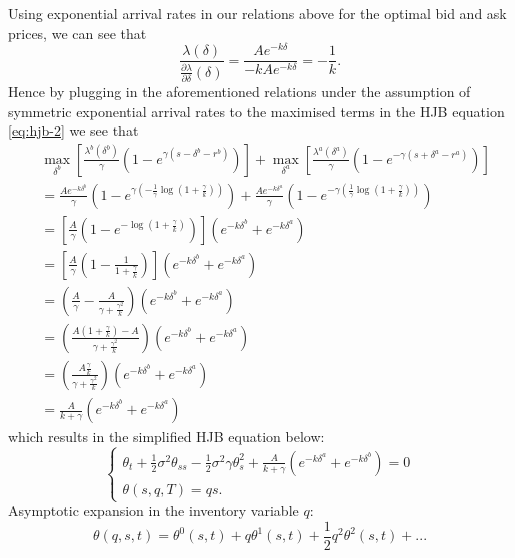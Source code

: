 Using exponential arrival rates in our relations above for the optimal bid and 
ask prices, we can see that
\begin{equation*}
    \frac{\lambda(\delta)}{\frac{\partial\lambda}{\partial\delta}(\delta)}=\frac{Ae^{-k\delta}}{-kAe^{-k\delta}}=-\frac{1}{k}.
\end{equation*}
Hence by plugging in the aforementioned relations under the assumption of symmetric
exponential arrival rates to the maximised terms in the HJB equation \ref{eq:hjb-2}
we see that
\begin{align*}
    &\max\limits_{\delta^b}\left[\frac{\lambda^b(\delta^b)}{\gamma}(1-e^{\gamma(s-\delta^b-r^b)})\right]+\max\limits_{\delta^a}\left[\frac{\lambda^a(\delta^a)}{\gamma}(1-e^{-\gamma(s+\delta^a-r^a)})\right]\\
    &=\frac{Ae^{-k\delta^b}}{\gamma}\left(1-e^{\gamma\left(-\frac{1}{\gamma}\log\left(1+\frac{\gamma}{k}\right)\right)}\right)+\frac{Ae^{-k\delta^a}}{\gamma}\left(1-e^{-\gamma\left(\frac{1}{\gamma}\log\left(1+\frac{\gamma}{k}\right)\right)}\right)\\
    &=\left[\frac{A}{\gamma}\left(1-e^{-\log\left(1+\frac{\gamma}{k}\right)}\right)\right](e^{-k\delta^b}+e^{-k\delta^a})\\
    &=\left[\frac{A}{\gamma}\left(1-\frac{1}{1+\frac{\gamma}{k}}\right)\right](e^{-k\delta^b}+e^{-k\delta^a})\\
    &=\left(\frac{A}{\gamma}-\frac{A}{\gamma+\frac{\gamma^2}{k}}\right)(e^{-k\delta^b}+e^{-k\delta^a})\\
    &=\left(\frac{A\left(1+\frac{\gamma}{k}\right)-A}{\gamma+\frac{\gamma^2}{k}}\right)(e^{-k\delta^b}+e^{-k\delta^a})\\
    &=\left(\frac{A\frac{\gamma}{k}}{\gamma+\frac{\gamma^2}{k}}\right)(e^{-k\delta^b}+e^{-k\delta^a})\\
    &=\frac{A}{k+\gamma}(e^{-k\delta^b}+e^{-k\delta^a})
\end{align*}
which results in the simplified HJB equation below:
\begin{equation}\label{eq:simp-hjb}
    \begin{cases} 
        \theta_t+\frac{1}{2}\sigma^2\theta_{ss}-\frac{1}{2}\sigma^2\gamma\theta^2_s+\frac{A}{k+\gamma}(e^{-k\delta^a}+e^{-k\delta^b})=0\\
        \theta(s,q,T)=qs.
    \end{cases}
\end{equation}
Asymptotic expansion in the inventory variable $q$:
\begin{equation}\label{eq:asymp}
    \theta(q,s,t)=\theta^0(s,t)+q\theta^1(s,t)+\frac{1}{2}q^2\theta^2(s,t)+...
\end{equation}
